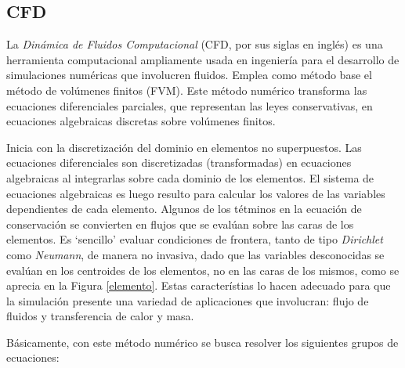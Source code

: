 \begin{center}
	\section{CFD}
\end{center}
\noindent
\justify

La \textit{Din\'amica de Fluidos Computacional} (CFD, por sus siglas en ingl\'es) es una herramienta computacional ampliamente usada en ingenier\'ia para el desarrollo de simulaciones num\'ericas que involucren fluidos. Emplea como m\'etodo base el m\'etodo de vol\'umenes finitos (FVM). Este m\'etodo num\'erico transforma las ecuaciones diferenciales parciales, que representan las leyes conservativas, en ecuaciones algebraicas discretas sobre vol\'umenes finitos. 

\noindent
\justify

Inicia con la discretizaci\'on del dominio en elementos no superpuestos. Las ecuaciones diferenciales son discretizadas (transformadas) en ecuaciones algebraicas al integrarlas sobre cada dominio de los elementos. El sistema de ecuaciones algebraicas es luego resulto para calcular los valores de las variables dependientes de cada elemento. Algunos de los t\'etminos en la ecuaci\'on de conservaci\'on se convierten en flujos que se eval\'uan sobre las caras de los elementos. Es `sencillo' evaluar condiciones de frontera, tanto de tipo \textit{Dirichlet} como \textit{Neumann}, de manera no invasiva, dado que las variables desconocidas se eval\'uan en los centroides de los elementos, no en las caras de los mismos, como se aprecia en la Figura \ref{elemento}. Estas caracter\'istias lo hacen adecuado para que la simulaci\'on presente una variedad de aplicaciones que involucran: flujo de fluidos y transferencia de calor y masa.

\noindent
\justify

B\'asicamente, con este m\'etodo num\'erico se busca resolver los siguientes grupos de ecuaciones:

